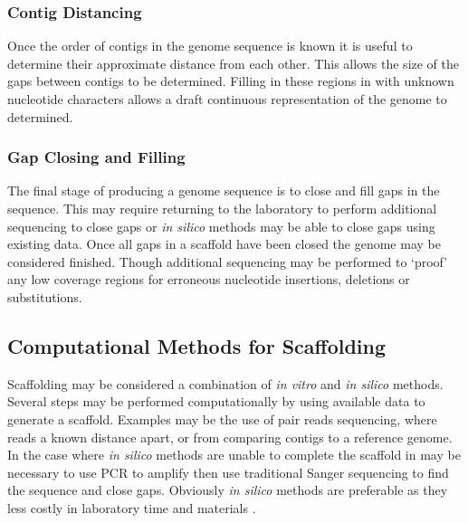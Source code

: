 \documentclass[10pt]{bmc_article}
\newenvironment{bmcformat}{\begin{raggedright}\baselineskip20pt\sloppy\setboolean{publ}{false}}{\end{raggedright}\baselineskip20pt\sloppy}
\begin{document}
\begin{bmcformat}
\subsubsection*{Contig Distancing} %

Once the order of contigs in the genome sequence is known it is useful to
determine their approximate distance from each other. This allows the size of
the gaps between contigs to be determined. Filling in these regions in with
unknown nucleotide characters allows a draft continuous representation of the
genome to determined.

\subsubsection*{Gap Closing and Filling} %

The final stage of producing a genome sequence is to close and fill gaps in
the sequence. This may require returning to the laboratory to perform
additional sequencing to close gaps or \emph{in silico} methods may be able to
close gaps using existing data. Once all gaps in a scaffold have been closed
the genome may be considered finished. Though additional sequencing may be
performed to `proof' any low coverage regions for erroneous nucleotide
insertions, deletions or substitutions.

\subsection*{Computational Methods for Scaffolding} %

Scaffolding may be considered a combination of \emph{in vitro} and \emph{in
silico} methods. Several steps may be performed computationally by using
available data to generate a scaffold. Examples may be the use of pair reads
sequencing, where reads a known distance apart, or from comparing contigs to
a reference genome. In the case where \emph{in silico} methods are unable to
complete the scaffold in may be necessary to use PCR to amplify then use
traditional Sanger sequencing to find the sequence and close gaps. Obviously
\emph{in silico} methods are preferable as they less costly in laboratory time
and materials \cite{nagarajan2010}. \pb


\end{bmcformat}
\end{document}
